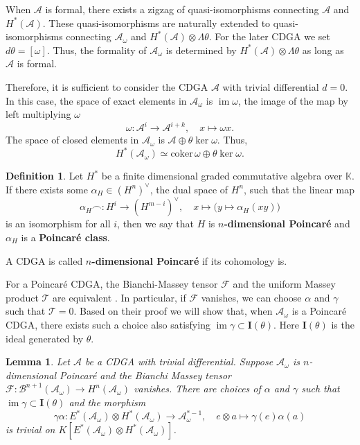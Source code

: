 \documentclass{article}
\theoremstyle{plain}
\newtheorem{lem}[thm]{Lemma}
\theoremstyle{definition}
\newtheorem{defn}[thm]{Definition}
\theoremstyle{plain}
\DeclareMathOperator{\im}{im}
\numberwithin{equation}{section}
\begin{document}
When $\mathcal{A}$ is formal, there exists a zigzag of quasi-isomorphisms connecting $\mathcal{A}$ and $H^*(\mathcal{A})$. These quasi-isomorphisms are naturally extended to quasi-isomorphisms connecting $\mathcal{A}_{\omega}$ and $H^*(\mathcal{A})\otimes \Lambda\theta$. For the later CDGA we set $d\theta=[\omega]$. Thus, the formality of $\mathcal{A}_{\omega}$ is determined by $H^*(\mathcal{A})\otimes \Lambda\theta$ as long as $\mathcal{A}$ is formal.

Therefore, it is sufficient to consider the CDGA $\mathcal{A}$ with trivial differential $d=0$. In this case, the space of exact elements in $\mathcal{A}_{\omega}$ is $\im\omega$, the image of the map by left multiplying $\omega$
$$
\omega:\mathcal{A}^i\to\mathcal{A}^{i+k},\quad x\mapsto\omega x.
$$
The space of closed elements in $\mathcal{A}_{\omega}$ is $\mathcal{A}\oplus \theta\ker\omega$. Thus,
$$
H^*(\mathcal{A}_{\omega})\simeq \text{coker}\,\omega\oplus\theta\ker\omega.
$$






\begin{defn} 
Let $H^*$ be a finite dimensional graded commutative algebra over $\mathbb{K}$. If there exists some $\alpha_H\in (H^n)^{\vee}$, the dual space of $H^n$, such that the linear map
$$
\alpha_H\frown:H^i\to (H^{m-i})^{\vee},\quad x\mapsto\big(y\mapsto\alpha_H(xy)\big)
$$
is an isomorphism for all $i$, then we say that $H$ is \textbf{$n$-dimensional Poincar\'e} and $\alpha_H$ is a \textbf{Poincar\'e class}.

A CDGA is called \textbf{$n$-dimensional Poincar\'e} if its cohomology is.
\end{defn}

For a Poincar\'e CDGA, the Bianchi-Massey tensor $\mathcal{F}$ and the uniform Massey product $\mathcal{T}$ are equivalent \cite[Lemma 2.8]{cn}. In particular, if $\mathcal{F}$ vanishes, we can choose $\alpha$ and $\gamma$ such that $\mathcal{T}=0$. Based on their proof we will show that, when $\mathcal{A}_{\omega}$ is a Poincar\'e CDGA, there exists such a choice also satisfying $\im\gamma\subset\mathbf{I}(\theta)$. Here $\mathbf{I}(\theta)$ is the ideal generated by $\theta$.

\begin{lem}\label{vanishing uniform massey}
Let $\mathcal{A}$ be a CDGA with trivial differential. Suppose $\mathcal{A}_{\omega}$ is $n$-dimensional Poincar\'e and the Bianchi Massey tensor $\mathcal{F}:\mathcal{B}^{n+1}(\mathcal{A}_{\omega})\to H^n(\mathcal{A}_{\omega})$ vanishes. There are choices of $\alpha$ and $\gamma$ such that $\im\gamma\subset \mathbf{I}(\theta)$ and the morphism
$$
\gamma\alpha: E^*(\mathcal{A}_{\omega})\otimes H^*(\mathcal{A}_{\omega})\to \mathcal{A}_{\omega}^{*-1},\quad e\otimes a\mapsto \gamma(e)\alpha(a)
$$
is trivial on $K[E^*(\mathcal{A}_{\omega})\otimes H^*(\mathcal{A}_{\omega})]$.
\end{lem}
\end{document}
